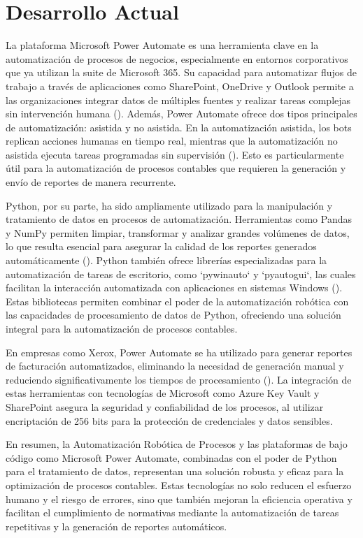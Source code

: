 \documentclass[letter,oneside,12pt,spanish]{report}
\begin{document}
\section{Desarrollo Actual}

\noindent La plataforma Microsoft Power Automate es una herramienta clave en la automatización de procesos de negocios, especialmente en entornos corporativos que ya utilizan la suite de Microsoft 365. Su capacidad para automatizar flujos de trabajo a través de aplicaciones como SharePoint, OneDrive y Outlook permite a las organizaciones integrar datos de múltiples fuentes y realizar tareas complejas sin intervención humana (\cite{microsoft2024powerautomate}). Además, Power Automate ofrece dos tipos principales de automatización: asistida y no asistida. En la automatización asistida, los bots replican acciones humanas en tiempo real, mientras que la automatización no asistida ejecuta tareas programadas sin supervisión (\cite{xerox2023powerautomate}). Esto es particularmente útil para la automatización de procesos contables que requieren la generación y envío de reportes de manera recurrente.

\noindent Python, por su parte, ha sido ampliamente utilizado para la manipulación y tratamiento de datos en procesos de automatización. Herramientas como Pandas y NumPy permiten limpiar, transformar y analizar grandes volúmenes de datos, lo que resulta esencial para asegurar la calidad de los reportes generados automáticamente (\cite{rattenbury2017principles}). Python también ofrece librerías especializadas para la automatización de tareas de escritorio, como `pywinauto` y `pyautogui`, las cuales facilitan la interacción automatizada con aplicaciones en sistemas Windows (\cite{pywinauto2024}). Estas bibliotecas permiten combinar el poder de la automatización robótica con las capacidades de procesamiento de datos de Python, ofreciendo una solución integral para la automatización de procesos contables.

\noindent En empresas como Xerox, Power Automate se ha utilizado para generar reportes de facturación automatizados, eliminando la necesidad de generación manual y reduciendo significativamente los tiempos de procesamiento (\cite{xerox2023powerautomate}). La integración de estas herramientas con tecnologías de Microsoft como Azure Key Vault y SharePoint asegura la seguridad y confiabilidad de los procesos, al utilizar encriptación de 256 bits para la protección de credenciales y datos sensibles.

\noindent En resumen, la Automatización Robótica de Procesos y las plataformas de bajo código como Microsoft Power Automate, combinadas con el poder de Python para el tratamiento de datos, representan una solución robusta y eficaz para la optimización de procesos contables. Estas tecnologías no solo reducen el esfuerzo humano y el riesgo de errores, sino que también mejoran la eficiencia operativa y facilitan el cumplimiento de normativas mediante la automatización de tareas repetitivas y la generación de reportes automáticos.
\end{document}
